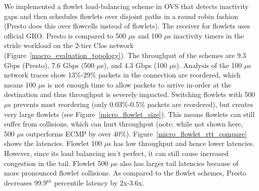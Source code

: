 We implemented a flowlet load-balancing scheme in OVS that detects
inactivity gaps and then schedules flowlets over disjoint paths in a round robin fashion
(Presto does this over flowcells instead of flowlets).
The receiver for flowlets uses official GRO.
Presto is compared to 500 $\mu$s and 100 $\mu$s inactivity timers in
the stride workload on the 2-tier Clos network (Figure~\ref{macro_evaluation_topology}).
The throughput of the schemes are 9.3 Gbps (Presto), 7.6 Gbps (500 $\mu$s), and 4.3 Gbps (100 $\mu$s).
Analysis of the 100 $\mu$s
network traces show 13\%-29\% packets in the connection are reordered, which means 100 $\mu$s is not enough
time to allow packets to arrive in-order at the destination and thus throughput is severely impacted. Switching flowlets with 500 $\mu$s prevents
most reordering (only 0.03\%-0.5\% packets are reordered), but creates very large flowlets (see Figure~\ref{micro_flowlet_size}). This means
flowlets can still suffer from collisions, which can hurt throughput (note: while not shown here, 500 $\mu$s outperforms ECMP by over 40\%).
Figure~\ref{micro_flowlet_rtt_compare} shows the
latencies. Flowlet 100 $\mu$s has low throughput and hence lower latencies. However, since
its load balancing isn't perfect, it can still cause increased congestion in the tail. Flowlet 500 $\mu$s
also has larger tail latencies because of more pronounced flowlet collisions. As compared to the flowlet
schemes, Presto decreases 99.9$^{th}$ percentile latency by 2x-3.6x.



